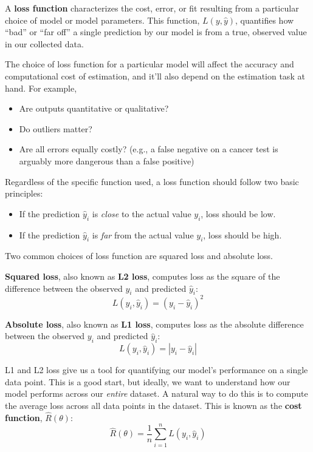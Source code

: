 \documentclass[
  letterpaper,
  DIV=11,
  numbers=noendperiod]{scrreprt}
\providecommand{\tightlist}{%
  \setlength{\itemsep}{0pt}\setlength{\parskip}{0pt}}\usepackage{longtable,booktabs,array}
\begin{document}
A \textbf{loss function} characterizes the cost, error, or fit resulting
from a particular choice of model or model parameters. This function,
\(L(y, \hat{y})\), quantifies how ``bad'' or ``far off'' a single
prediction by our model is from a true, observed value in our collected
data.

The choice of loss function for a particular model will affect the
accuracy and computational cost of estimation, and it'll also depend on
the estimation task at hand. For example,

\begin{itemize}
\tightlist
\item
  Are outputs quantitative or qualitative?
\item
  Do outliers matter?
\item
  Are all errors equally costly? (e.g., a false negative on a cancer
  test is arguably more dangerous than a false positive)
\end{itemize}

Regardless of the specific function used, a loss function should follow
two basic principles:

\begin{itemize}
\tightlist
\item
  If the prediction \(\hat{y}_i\) is \emph{close} to the actual value
  \(y_i\), loss should be low.
\item
  If the prediction \(\hat{y}_i\) is \emph{far} from the actual value
  \(y_i\), loss should be high.
\end{itemize}

Two common choices of loss function are squared loss and absolute loss.

\textbf{Squared loss}, also known as \textbf{L2 loss}, computes loss as
the square of the difference between the observed \(y_i\) and predicted
\(\hat{y}_i\): \[L(y_i, \hat{y}_i) = (y_i - \hat{y}_i)^2\]

\textbf{Absolute loss}, also known as \textbf{L1 loss}, computes loss as
the absolute difference between the observed \(y_i\) and predicted
\(\hat{y}_i\): \[L(y_i, \hat{y}_i) = |y_i - \hat{y}_i|\]

L1 and L2 loss give us a tool for quantifying our model's performance on
a single data point. This is a good start, but ideally, we want to
understand how our model performs across our \emph{entire} dataset. A
natural way to do this is to compute the average loss across all data
points in the dataset. This is known as the \textbf{cost function},
\(\hat{R}(\theta)\):
\[\hat{R}(\theta) = \frac{1}{n} \sum^n_{i=1} L(y_i, \hat{y}_i)\]
\end{document}
